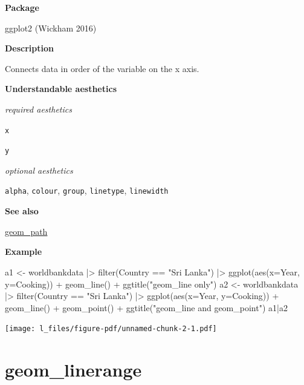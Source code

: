 \documentclass[
  letterpaper,
  DIV=11,
  numbers=noendperiod]{scrreprt}
\newenvironment{Shaded}{\begin{snugshade}}{\end{snugshade}}
\newcommand{\AttributeTok}[1]{\textcolor[rgb]{0.40,0.45,0.13}{#1}}
\newcommand{\FunctionTok}[1]{\textcolor[rgb]{0.28,0.35,0.67}{#1}}
\newcommand{\NormalTok}[1]{\textcolor[rgb]{0.00,0.23,0.31}{#1}}
\newcommand{\OtherTok}[1]{\textcolor[rgb]{0.00,0.23,0.31}{#1}}
\newcommand{\SpecialCharTok}[1]{\textcolor[rgb]{0.37,0.37,0.37}{#1}}
\newcommand{\StringTok}[1]{\textcolor[rgb]{0.13,0.47,0.30}{#1}}
\begin{document}
\textbf{Package}

ggplot2 (Wickham 2016)

\textbf{Description}

Connects data in order of the variable on the x axis.

\textbf{Understandable aesthetics}

\emph{required aesthetics}

\texttt{x}

\texttt{y}

\emph{optional aesthetics}

\texttt{alpha}, \texttt{colour}, \texttt{group}, \texttt{linetype},
\texttt{linewidth}

\textbf{See also}

\hyperref[path]{geom\_path}

\textbf{Example}

\begin{Shaded}
\begin{Highlighting}[]
\NormalTok{a1 }\OtherTok{\textless{}{-}}\NormalTok{ worldbankdata }\SpecialCharTok{|\textgreater{}}
  \FunctionTok{filter}\NormalTok{(Country }\SpecialCharTok{==} \StringTok{"Sri Lanka"}\NormalTok{) }\SpecialCharTok{|\textgreater{}}
  \FunctionTok{ggplot}\NormalTok{(}\FunctionTok{aes}\NormalTok{(}\AttributeTok{x=}\NormalTok{Year, }\AttributeTok{y=}\NormalTok{Cooking)) }\SpecialCharTok{+} 
  \FunctionTok{geom\_line}\NormalTok{() }\SpecialCharTok{+} \FunctionTok{ggtitle}\NormalTok{(}\StringTok{"geom\_line only"}\NormalTok{)}
\NormalTok{a2 }\OtherTok{\textless{}{-}}\NormalTok{ worldbankdata }\SpecialCharTok{|\textgreater{}}
  \FunctionTok{filter}\NormalTok{(Country }\SpecialCharTok{==} \StringTok{"Sri Lanka"}\NormalTok{) }\SpecialCharTok{|\textgreater{}}
  \FunctionTok{ggplot}\NormalTok{(}\FunctionTok{aes}\NormalTok{(}\AttributeTok{x=}\NormalTok{Year, }\AttributeTok{y=}\NormalTok{Cooking)) }\SpecialCharTok{+} 
  \FunctionTok{geom\_line}\NormalTok{() }\SpecialCharTok{+} 
  \FunctionTok{geom\_point}\NormalTok{() }\SpecialCharTok{+}
  \FunctionTok{ggtitle}\NormalTok{(}\StringTok{"geom\_line and geom\_point"}\NormalTok{)}
\NormalTok{a1}\SpecialCharTok{|}\NormalTok{a2}
\end{Highlighting}
\end{Shaded}

\texttt{[image: l\_files/figure-pdf/unnamed-chunk-2-1.pdf]}

\section{geom\_linerange}\label{geom_linerange}
\end{document}

